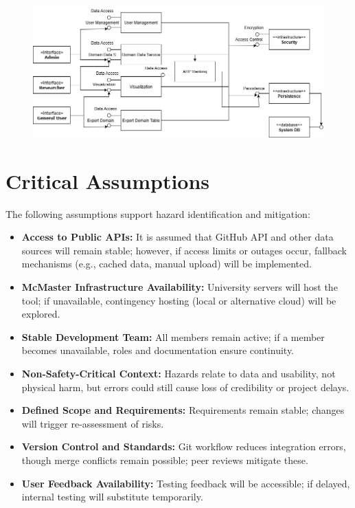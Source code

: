\documentclass{article}
\begin{document}
\begin{figure}[H]
    \centering
    \includegraphics[scale=0.5] {images/component.png}
\end{figure}

\section{Critical Assumptions}

The following assumptions support hazard identification and mitigation:

\begin{itemize}
    \item \textbf{Access to Public APIs:} It is assumed that GitHub API and other
    data sources will remain stable; however, if access limits or outages occur,
    fallback mechanisms (e.g., cached data, manual upload) will be implemented.
    
    \item \textbf{McMaster Infrastructure Availability:} University servers will
    host the tool; if unavailable, contingency hosting (local or alternative
    cloud) will be explored.
    
    \item \textbf{Stable Development Team:} All members remain active; if a
    member becomes unavailable, roles and documentation ensure continuity.
    
    \item \textbf{Non-Safety-Critical Context:} Hazards relate to data and
    usability, not physical harm, but errors could still cause loss of
    credibility or project delays.
    
    \item \textbf{Defined Scope and Requirements:} Requirements remain stable;
    changes will trigger re-assessment of risks.
    
    \item \textbf{Version Control and Standards:} Git workflow reduces
    integration errors, though merge conflicts remain possible; peer reviews
    mitigate these.
    
    \item \textbf{User Feedback Availability:} Testing feedback will be
    accessible; if delayed, internal testing will substitute temporarily.
\end{itemize}
\end{document}
